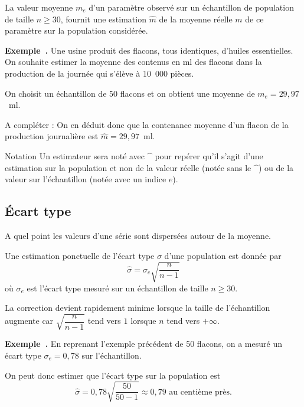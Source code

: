\documentclass[11pt,a4paper]{article}
\newcounter{exemplenum}
\newcommand{\exnum}{\stepcounter{exemplenum}\textbf{Exemple~\theexemplenum.} }
\begin{document}
\begin{propriete}
La valeur moyenne $m_e$ d'un paramètre observé sur un échantillon de population de taille $n \geqslant 30$, fournit une estimation $\hat{m}$ de la moyenne réelle $m$ de ce paramètre sur la population considérée.
\end{propriete}

\begin{exemple}
\exnum Une usine produit des flacons, tous identiques, d'huiles essentielles. On souhaite estimer la moyenne des contenus en ml des flacons dans la production de la journée qui s'élève à 10~000 pièces.

On choisit un échantillon de 50 flacons et on obtient une moyenne de $m_e = 29{,}97$~ml.

{\color{blue} A compléter  : On en déduit donc que la contenance moyenne d'un flacon de la production journalière est $\hat{m} = 29{,}97$~ml.}
\end{exemple}

\begin{cadre}[colback=blue!5!white]{Notation}
Un estimateur sera noté avec $\widehat{\phantom{x}}$ pour repérer qu'il s'agit d'une estimation sur la population et non de la valeur réelle (notée sans le $\widehat{\phantom{x}}$) ou de la valeur sur l'échantillon (notée avec un indice $e$).
\end{cadre}

\subsection{Écart type}

{\color{blue} A quel point les valeurs d'une série sont dispersées autour de la moyenne.}

\begin{propriete}
Une estimation ponctuelle de l'écart type $\sigma$ d'une population est donnée par
$$\hat{\sigma} = \sigma_e \sqrt{\dfrac{n}{n-1}}$$
où $\sigma_e$ est l'écart type mesuré sur un échantillon de taille $n \geqslant 30$.
\end{propriete}

\begin{remarque}
La correction devient rapidement minime lorsque la taille de l'échantillon augmente car $\sqrt{\dfrac{n}{n-1}}$ tend vers $1$ lorsque $n$ tend vers $+\infty$.
\end{remarque}

\begin{exemple}
\exnum En reprenant l'exemple précédent de 50 flacons, on a mesuré un écart type $\sigma_e = 0{,}78$ sur l'échantillon.


{\color{blue}On peut donc estimer que l'écart type sur la population est
$$\hat{\sigma} = 0{,}78 \sqrt{\dfrac{50}{50-1}} \approx 0{,}79 \text{ au centième près.}$$}
\end{exemple}
\end{document}
